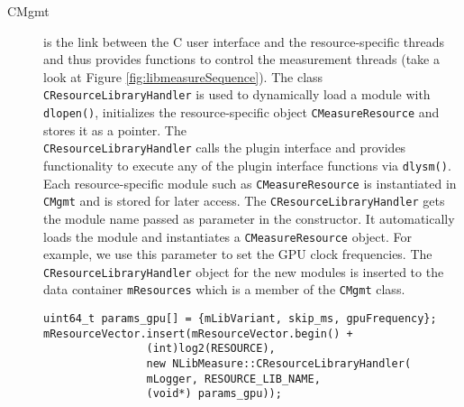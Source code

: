 \begin{description}
\item[CMgmt] is the link between the C user interface and the resource-specific threads and thus provides functions to control the measurement threads (take a look at Figure \ref{fig:libmeasureSequence}). The class \texttt{CResourceLibraryHandler} is used to dynamically load a module with \texttt{dlopen()}, initializes the resource-specific object \texttt{CMeasureResource} and stores it as a pointer. The \\\texttt{CResourceLibraryHandler} calls the plugin interface and provides functionality to execute any of the plugin interface functions via \texttt{dlysm()}. Each resource-specific module such as \texttt{CMeasureResource} is instantiated in \texttt{CMgmt} and is stored for later access. The \texttt{CResourceLibraryHandler} gets the module name passed as parameter in the constructor. It automatically loads the module and instantiates a \texttt{CMeasureResource} object.   For example, we use this parameter to set the GPU clock frequencies. The \texttt{CResourceLibraryHandler} object for the new modules is inserted to the data container \texttt{mResources} which is a member of the \texttt{CMgmt} class.\\
 
\begin{lstlisting}[caption={Extension to the \texttt{CMgmt} constructor. \added[id=ck]{Listing aktualisiert}}, label=lst:CMgmtExtension]
uint64_t params_gpu[] = {mLibVariant, skip_ms, gpuFrequency};
mResourceVector.insert(mResourceVector.begin() + 
				(int)log2(RESOURCE),
				new NLibMeasure::CResourceLibraryHandler(
				mLogger, RESOURCE_LIB_NAME,
				(void*)	params_gpu));
\end{lstlisting}


\end{description}
